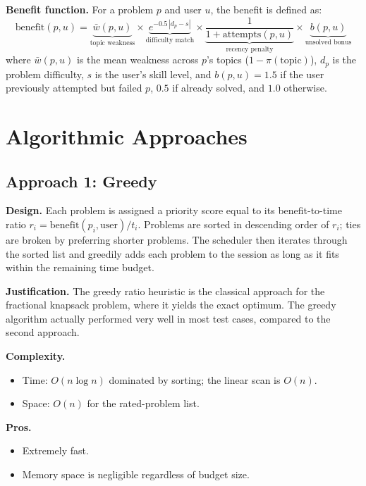 \documentclass{article}
\begin{document}
\textbf{Benefit function.} For a problem $p$ and user $u$, the benefit
is defined as:
\[
  \mathrm{benefit}(p, u)
  = \underbrace{\bar{w}(p,u)}_{\text{topic weakness}}
  \times \underbrace{e^{-0.5\,|d_p - s|}}_{\text{difficulty match}}
  \times \underbrace{\frac{1}{1+\text{attempts}(p,u)}}_{\text{recency penalty}}
  \times \underbrace{b(p,u)}_{\text{unsolved bonus}}
\]
where $\bar{w}(p,u)$ is the mean weakness across $p$'s topics
($1 - \pi(\text{topic})$), $d_p$ is the problem difficulty, $s$ is the
user's skill level, and $b(p,u) = 1.5$ if the user previously attempted
but failed $p$, $0.5$ if already solved, and $1.0$ otherwise.
 
\section{Algorithmic Approaches}
 
\subsection{Approach 1: Greedy}
 
\textbf{Design.} Each problem is assigned a priority score equal to its
benefit-to-time ratio $r_i = \mathrm{benefit}(p_i, \text{user}) / t_i$. Problems are
sorted in descending order of $r_i$; ties are broken by preferring
shorter problems. The scheduler then iterates through the sorted list
and greedily adds each problem to the session as long as it fits within
the remaining time budget.
 
\textbf{Justification.} The greedy ratio heuristic is the classical
approach for the fractional knapsack problem, where it yields the exact
optimum. The greedy algorithm actually performed very well in most test cases, compared to the second approach.
 
\textbf{Complexity.}
\begin{itemize}
  \item Time: $O(n \log n)$ dominated by sorting; the linear scan is
        $O(n)$.
  \item Space: $O(n)$ for the rated-problem list.
\end{itemize}
 
\textbf{Pros.}
\begin{itemize}
  \item Extremely fast.
  \item Memory space is negligible regardless of budget size.
\end{itemize}
 
\end{document}
